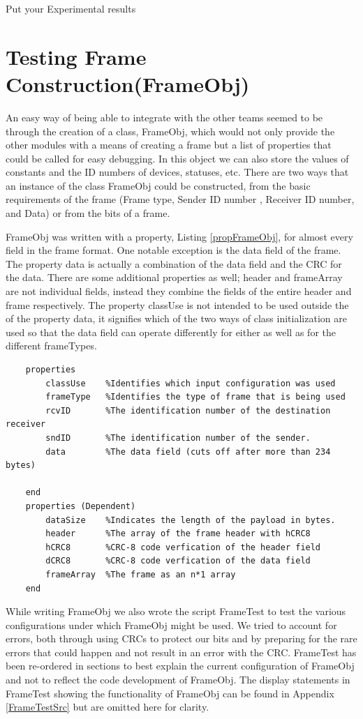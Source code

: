 
Put your Experimental results
\section{Testing Frame Construction(FrameObj)}
An easy way of being able to integrate with the other teams seemed to be through the creation of a class, FrameObj, which would not only provide the other modules with a means of creating a frame but a list of properties that could be called for easy debugging. In this object we can also store the values of constants and the ID numbers of devices, statuses, etc.  There are two ways that an instance of the class FrameObj could be constructed,  from the basic requirements of the frame (Frame type, Sender ID number , Receiver ID number, and Data) or from the bits of a frame.

FrameObj was written with a property, Listing \ref{propFrameObj}, for almost every field in the frame format. One notable exception is the data field of the frame. The property data is actually a combination of the data field and the CRC for the data. There are some additional properties as well; header and frameArray are not individual fields, instead they combine the fields of the entire header and frame respectively. The property classUse is not intended to be used outside the of the property data, it signifies which of the two ways of class initialization are used so that the data field can operate differently for either as well as for the different frameTypes.
\begin{lstlisting} 
    properties
        classUse    %Identifies which input configuration was used
        frameType   %Identifies the type of frame that is being used
        rcvID       %The identification number of the destination receiver
        sndID       %The identification number of the sender.
        data        %The data field (cuts off after more than 234 bytes)
        
    end
    properties (Dependent)
        dataSize    %Indicates the length of the payload in bytes.
        header      %The array of the frame header with hCRC8
        hCRC8       %CRC-8 code verfication of the header field
        dCRC8       %CRC-8 code verfication of the data field
        frameArray  %The frame as an n*1 array
    end
\end{lstlisting}

While writing FrameObj we also wrote the script FrameTest to test the various configurations under which FrameObj might be used. We tried to account for errors, both through using CRCs to protect our bits and by preparing for the rare errors that could happen and not result in an error with the CRC. FrameTest has been re-ordered in sections to best explain the current configuration of FrameObj and not to reflect the code development of FrameObj. The display statements in FrameTest showing the functionality of FrameObj can be found in Appendix \ref{FrameTestSrc} but are omitted here for clarity.


